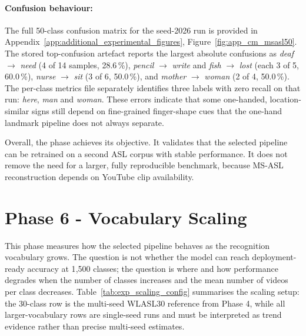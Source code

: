 \paragraph{Confusion behaviour:} The full 50-class confusion matrix for the seed-2026 run is provided in
Appendix~\ref{app:additional_experimental_figures}, Figure~\ref{fig:app_cm_msasl50}. The stored
top-confusion artefact reports the largest absolute confusions as \emph{deaf} $\rightarrow$
\emph{need} (4 of 14 samples, 28.6\,\%), \emph{pencil} $\rightarrow$ \emph{write} and \emph{fish}
$\rightarrow$ \emph{lost} (each 3 of 5, 60.0\,\%), \emph{nurse} $\rightarrow$ \emph{sit} (3 of 6,
50.0\,\%), and \emph{mother} $\rightarrow$ \emph{woman} (2 of 4, 50.0\,\%). The per-class metrics
file separately identifies three labels with zero recall on that run: \emph{here}, \emph{man} and
\emph{woman}. These errors indicate that some one-handed, location-similar signs still depend on
fine-grained finger-shape cues that the one-hand landmark pipeline does not always separate.

Overall, the phase achieves its objective. It validates that the selected pipeline can be retrained
on a second ASL corpus with stable performance. It does not remove the need for a larger, fully
reproducible benchmark, because MS-ASL reconstruction depends on YouTube clip availability.

\section{Phase 6 - Vocabulary Scaling}
\label{sec:exp_scaling}

This phase measures how the selected pipeline behaves as the recognition vocabulary grows. The
question is not whether the model can reach deployment-ready accuracy at 1{,}500 classes; the
question is where and how performance degrades when the number of classes increases and the mean
number of videos per class decreases. Table~\ref{tab:exp_scaling_config} summarises the scaling
setup: the 30-class row is the multi-seed WLASL30 reference from Phase 4, while all
larger-vocabulary rows are single-seed runs and must be interpreted as trend evidence rather than
precise multi-seed estimates.

